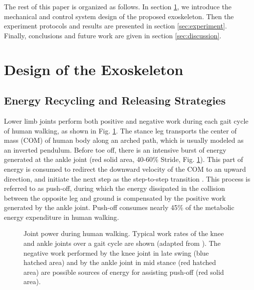 \documentclass[10pt]{asme2ej}
\begin{document}
The rest of this paper is organized as follows.
In section \ref{sec:design}, we introduce the mechanical and control system design of the proposed exoskeleton.
Then the experiment protocols and results are presented in section \ref{sec:experiment}.
Finally, conclusions and future work are given in section \ref{sec:discussion}.


\section{Design of the Exoskeleton}
\label{sec:design}

\subsection{Energy Recycling and Releasing Strategies}
\label{subsec:Biomechanics}

Lower limb joints perform both positive and negative work during each gait cycle of human walking, as shown in Fig. \ref{fig:work}.
The stance leg transports the center of mass (COM) of human body along an arched path, which is usually modeled as an inverted pendulum\cite{RN13}.
Before toe off, there is an intensive burst of energy generated at the ankle joint (red solid area, 40-60\% Stride, Fig. \ref{fig:work}).
This part of energy is consumed to redirect the downward velocity of the COM to an upward direction, and initiate the next step as the step-to-step transition \cite{RN14,wu2016effects}.
This process is referred to as push-off, during which the energy dissipated in the collision between the opposite leg and ground is compensated by the positive work generated by the ankle joint.
Push-off consumes nearly 45\% of the metabolic energy expenditure in human walking\cite{RN15}.

\begin{figure}[b]
	\caption{Joint power during human walking.
	Typical work rates of the knee and ankle joints over a gait cycle are shown (adapted from \cite{RN2}).
	The negative work performed by the knee joint in late swing (blue hatched area) and by the ankle joint in mid stance (red hatched area) are possible sources of energy for assisting push-off (red solid area).}
	\label{fig:work}
\end{figure}
\end{document}
